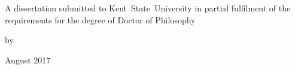 \begin{center}
    \thispagestyle{empty}
    \makeatletter

    \vspace*{\fill}

    {
        \LARGE
        \@title
        \par
    }

    \vspace*{\fill}
    \vspace*{\fill}

    \parbox[t]{6.2cm}
    {%
        \centering
        A dissertation submitted to Kent~State~University in partial fulfilment of the requirements for the degree of Doctor of Philosophy
    }

    \vspace*{\fill}
    \vspace*{\fill}

    by \\
    \@author

    \vspace*{4ex}

    August 2017

    \makeatother
\end{center}
